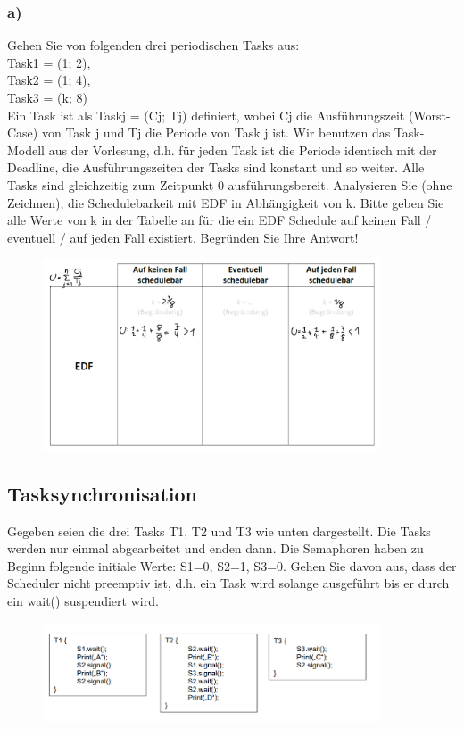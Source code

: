 \subsubsection{a)}
Gehen Sie von folgenden drei periodischen Tasks aus:\\
Task1 = (1; 2),\\
Task2 = (1; 4),\\
Task3 = (k; 8)\\
Ein Task ist als Taskj = (Cj; Tj) definiert, wobei Cj die Ausführungszeit (Worst-Case) von Task j und Tj die
Periode von Task j ist. Wir benutzen das Task-Modell aus der Vorlesung, d.h. für jeden Task ist die Periode
identisch mit der Deadline, die Ausführungszeiten der Tasks sind konstant und so weiter. Alle Tasks sind
gleichzeitig zum Zeitpunkt 0 ausführungsbereit.
Analysieren Sie (ohne Zeichnen), die Schedulebarkeit mit EDF in Abhängigkeit von k. Bitte geben Sie alle
Werte von k in der Tabelle an für die ein EDF Schedule auf keinen Fall / eventuell / auf jeden Fall existiert.
Begründen Sie Ihre Antwort!
\begin{figure}[H]
  \includegraphics[width=10cm]{images/KA270921/3a.PNG}
  \centering
\end{figure}
\subsection{Tasksynchronisation}
Gegeben seien die drei Tasks T1, T2 und T3 wie unten dargestellt. Die Tasks werden nur einmal
abgearbeitet und enden dann. Die Semaphoren haben zu Beginn folgende initiale Werte: S1=0, S2=1, S3=0.
Gehen Sie davon aus, dass der Scheduler nicht preemptiv ist, d.h. ein Task wird solange ausgeführt bis er
durch ein wait() suspendiert wird.
\begin{figure}[H]
  \includegraphics[width=10cm]{images/KA270921/4a.PNG}
  \centering
\end{figure}

